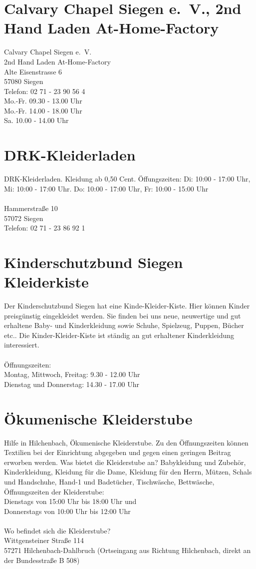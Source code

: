 \section{Calvary Chapel Siegen e.~V., 2nd Hand Laden At-Home-Factory }
Calvary Chapel Siegen e.~V.\\
2nd Hand Laden At-Home-Factory \\
Alte Eisenstrasse 6\\
57080 Siegen \\
Telefon: 02 71 - 23 90 56 4 \\
Mo.-Fr. 09.30 - 13.00 Uhr \\
Mo.-Fr. 14.00 - 18.00 Uhr \\
Sa. 10.00 - 14.00 Uhr 

\section{DRK-Kleiderladen }
DRK-Kleiderladen. Kleidung ab 0,50 Cent. Öffungszeiten: Di:  10:00 - 17:00 Uhr, Mi:  10:00 - 17:00 Uhr. Do: 10:00 - 17:00 Uhr, Fr:  10:00 - 15:00 Uhr\\
\\
Hammerstraße 10\\
57072 Siegen\\
Telefon: 02 71 - 23 86 92 1 

\section{Kinderschutzbund Siegen Kleiderkiste}
Der Kinderschutzbund Siegen hat eine Kinde-Kleider-Kiste. Hier können Kinder preisgünstig eingekleidet werden. Sie finden bei uns neue, neuwertige und gut erhaltene Baby- und Kinderkleidung sowie Schuhe, Spielzeug, Puppen, Bücher etc.. Die Kinder-Kleider-Kiste ist ständig an gut erhaltener Kinderkleidung interessiert.\\
\\
Öffnungszeiten: \\
Montag, Mittwoch, Freitag: 9.30 - 12.00 Uhr \\
Dienstag und Donnerstag: 14.30 - 17.00 Uhr \\

\section{Ökumenische Kleiderstube}
Hilfe in Hilchenbach, Ökumenische Kleiderstube. Zu den Öffnungszeiten können Textilien bei der Einrichtung abgegeben und gegen einen geringen Beitrag erworben werden. Was bietet die Kleiderstube an? Babykleidung und Zubehör, Kinderkleidung, Kleidung für die 
Dame, Kleidung für den Herrn, Mützen, Schals und Handschuhe, Hand-1 und Badetücher, Tischwäsche, Bettwäsche, Öffnungszeiten der Kleiderstube:\\
Dienstags von 15:00 Uhr bis 18:00 Uhr und \\
Donnerstags von 10:00 Uhr bis 12:00 Uhr \\
\\
Wo befindet sich die Kleiderstube? \\
Wittgensteiner Straße 114\\
57271 Hilchenbach-Dahlbruch (Ortseingang aus Richtung Hilchenbach, direkt an der Bundesstraße B 508)

